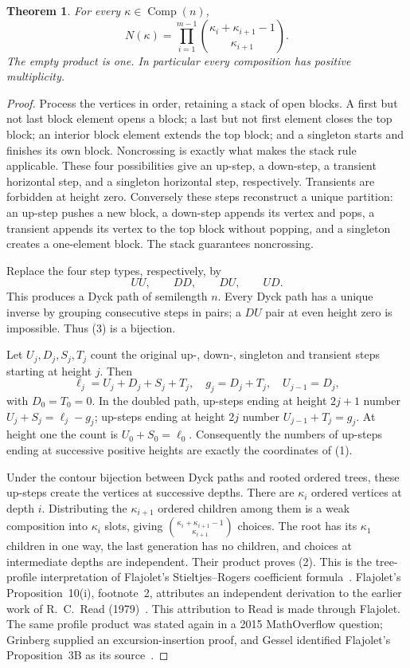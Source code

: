 \documentclass[11pt]{article}
\newtheorem{theorem}{Theorem}
\newcommand{\Comp}{\operatorname{Comp}}
\begin{document}
\begin{theorem}\label{thm:product}
For every $\kappa\in\Comp(n)$,
\[
 N(\kappa)=\prod_{i=1}^{m-1}
       \binom{\kappa_i+\kappa_{i+1}-1}{\kappa_{i+1}}.
 \tag{2}
\]
The empty product is one. In particular every composition has positive
multiplicity.
\end{theorem}
\begin{proof}
Process the vertices in order, retaining a stack of open blocks.
A first but not last block element opens a block; a last but not first
element closes the top block; an interior block element extends the top
block; and a singleton starts and finishes its own block.
Noncrossing is exactly what makes the stack rule applicable. These four
possibilities give an up-step, a down-step, a transient horizontal step,
and a singleton horizontal step, respectively. Transients are forbidden
at height zero. Conversely these steps reconstruct a unique partition:
an up-step pushes a new block, a down-step appends its vertex and pops,
a transient appends its vertex to the top block without popping, and a
singleton creates a one-element block. The stack guarantees noncrossing.

Replace the four step types, respectively, by
\[
 UU,\qquad DD,\qquad DU,\qquad UD.
 \tag{3}
\]
This produces a Dyck path of semilength $n$. Every Dyck path has a unique
inverse by grouping consecutive steps in pairs; a $DU$ pair at even
height zero is impossible. Thus (3) is a bijection.

Let $U_j,D_j,S_j,T_j$ count the original up-, down-, singleton and
transient steps starting at height $j$. Then
\[
 \ell_j=U_j+D_j+S_j+T_j,\quad g_j=D_j+T_j,\quad
 U_{j-1}=D_j,
 \tag{4}
\]
with $D_0=T_0=0$. In the doubled path, up-steps ending at height $2j+1$
number $U_j+S_j=\ell_j-g_j$; up-steps ending at height $2j$ number
$U_{j-1}+T_j=g_j$. At height one the count is $U_0+S_0=\ell_0$.
Consequently the numbers of up-steps ending at successive positive
heights are exactly the coordinates of (1).

Under the contour bijection between Dyck paths and rooted ordered
trees, these up-steps create the vertices at successive depths.
There are $\kappa_i$ ordered vertices at depth $i$. Distributing the
$\kappa_{i+1}$ ordered children among them is a weak composition into
$\kappa_i$ slots, giving
$\binom{\kappa_i+\kappa_{i+1}-1}{\kappa_{i+1}}$ choices.
The root has its $\kappa_1$ children in one way, the last generation has
no children, and choices at intermediate depths are independent.
Their product proves (2). This is the tree-profile interpretation of
Flajolet's Stieltjes--Rogers coefficient formula~\cite[p.~132,
Proposition~3B; pp.~150--151, Proposition~10(i)]{F}.
Flajolet's Proposition~10(i), footnote~2, attributes an independent
derivation to the earlier work of R.~C.~Read (1979)~\cite{Read}.
This attribution to Read is made through Flajolet.
The same profile product was stated again in a 2015 MathOverflow
question; Grinberg supplied an excursion-insertion proof, and Gessel
identified Flajolet's Proposition~3B as its source~\cite{MO}.
\end{proof}
\end{document}

